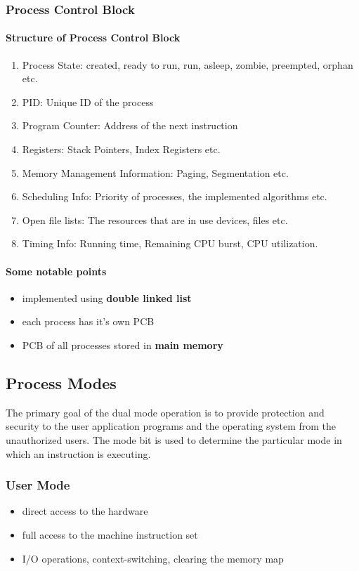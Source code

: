 \subsubsection{Process Control Block}
\paragraph{Structure of Process Control Block}
\begin{enumerate}
	\item Process State: created, ready to run, run, asleep, zombie, preempted, orphan etc.
	\item PID: Unique ID of the process
	\item Program Counter: Address of the next instruction
	\item Registers: Stack Pointers, Index Registers etc.
	\item Memory Management Information: Paging, Segmentation etc.
	\item Scheduling Info: Priority of processes, the implemented algorithms etc. 
	\item Open file lists: The resources that are in use devices, files etc.
	\item Timing Info: Running time, Remaining CPU burst, CPU utilization.
\end{enumerate}
\paragraph{Some notable points}
\begin{itemize}
	\item implemented using \textbf{double linked list}
	\item each process has it's own PCB
	\item PCB of all processes stored in \textbf{main memory}
\end{itemize}

\subsection{Process Modes}
The primary goal of the dual mode operation is to provide protection and security to the user application programs and the
operating system from the unauthorized users. The mode bit is used to determine the particular mode in which an instruction
is executing.
\subsubsection{User Mode}
\begin{itemize}
	\item direct access to the hardware 
	\item full access to the machine instruction set
	\item I/O operations, context-switching, clearing the memory map
\end{itemize}

